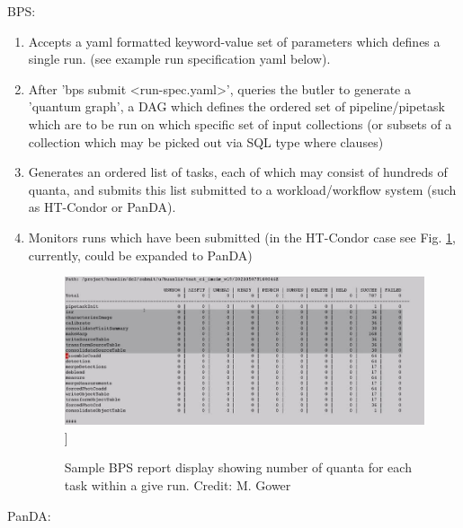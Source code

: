 \documentclass[DM,authoryear,toc]{lsstdoc}
\begin{document}
BPS:
\begin{enumerate}

\item Accepts a yaml formatted keyword-value set of parameters which
defines a single run. (see example run specification yaml below).

\item After 'bps submit <run-spec.yaml>', queries the butler to generate
a 'quantum graph', a DAG which defines the ordered set of 
pipeline/pipetask which are to be run on which specific set of input 
collections (or subsets of a collection which may be picked out via SQL
type where clauses)

\item Generates an ordered list of tasks, each of which may consist
of hundreds of quanta, and submits this list submitted to a 
workload/workflow system (such as HT-Condor or PanDA).

\item Monitors runs which have been submitted  
	(in the HT-Condor case see Fig. \ref{bpsreport}, currently, could be expanded to PanDA) 

\begin{figure}
\includegraphics[width=\textwidth]{bpsreport.jpg}]
\caption{Sample BPS report display showing number of quanta for each task within a give run.
Credit: M. Gower}
\label{bpsreport}
\end{figure}


\end{enumerate}

PanDA:
\end{document}
